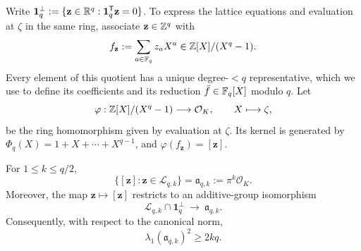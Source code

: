 Write
$\mathbf1_q^\perp:=\{\mathbf z\in\mathbb R^q:
\mathbf1_q^{\mathsf T}\mathbf z=0\}$.  To express the lattice equations and
evaluation at $\zeta$ in the same ring, associate $\mathbf z\in\mathbb Z^q$ with
\[
 f_{\mathbf z}:=\sum_{a\in\mathbb F_q}z_aX^a
 \in\mathbb Z[X]/(X^q-1).
\]
Every element of this quotient has a unique degree-$<q$ representative, which
we use to define its coefficients and its reduction $\bar f\in\mathbb F_q[X]$ modulo
$q$.  Let
\[
 \varphi:\mathbb Z[X]/(X^q-1)\longrightarrow \mathcal{O}_K,
 \qquad X\longmapsto\zeta,
\]
be the ring homomorphism given by evaluation at $\zeta$.  Its kernel is
generated by $\Phi_q(X)=1+X+\cdots+X^{q-1}$, and
$\varphi(f_{\mathbf z})=[\mathbf z]$.

\begin{theorem}
\label{thm:cyclotomic-descent}
For $1\le k\le q/2$,
\[
 \{[\mathbf z]:\mathbf z\in\mathcal L_{q,k}\}
 =\mathfrak a_{q,k}:=\pi^k\mathcal{O}_K.
\]
Moreover, the map $\mathbf z\mapsto[\mathbf z]$ restricts to an
additive-group isomorphism
\[
 \mathcal L_{q,k}\cap\mathbf1_q^\perp
 \ \longrightarrow\ \mathfrak a_{q,k}.
\]
Consequently, with respect to the canonical norm,
\[
 \lambda_1(\mathfrak a_{q,k})^2\ge2kq.
\]
\end{theorem}

